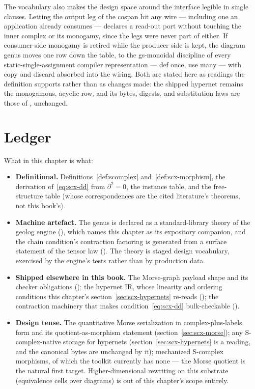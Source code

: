 The vocabulary also makes the design space around the interface
legible in single clauses. Letting the output leg of the cospan hit
any wire --- including one an application already consumes ---
declares a read-out port without touching the inner complex or its
monogamy, since the legs were never part of either. If consumer-side
monogamy is retired while the producer side is kept, the diagram
genus moves one row down the table, to the gs-monoidal discipline
of every static-single-assignment compiler representation --- def
once, use many --- with copy and discard absorbed into the wiring.
Both are stated here as readings the definition supports rather than
as changes made: the shipped hypernet remains the monogamous, acyclic
row, and its bytes, digests, and substitution laws are those of
, unchanged.

\section{Ledger}
\label{sec:scx-ledger}

What in this chapter is what:

\begin{itemize}
\item \textbf{Definitional.} Definitions~\ref{def:scomplex}
  and~\ref{def:scx-morphism}, the derivation of~\eqref{eq:scx-dd}
  from $\partial^2 = 0$, the instance table, and the free-structure
  table (whose correspondences are the cited literature's theorems,
  not this book's).
\item \textbf{Machine artefact.} The genus is declared as a
  standard-library theory of the geolog engine
  (), which names this chapter as its
  expository companion, and the chain condition's contraction
  factoring is generated from a surface statement of the tensor law
  (). The theory is staged
  design vocabulary, exercised by the engine's tests rather than by
  production data.
\item \textbf{Shipped elsewhere in this book.} The Morse-graph
  payload shape and its checker obligations
  (); the
  hypernet IR, whose linearity and ordering conditions this
  chapter's section~\ref{sec:scx-hypernets} re-reads
  (); the
  contraction machinery that makes
  condition~\eqref{eq:scx-dd} bulk-checkable
  ().
\item \textbf{Design tense.} The quantitative Morse serialization in
  complex-plus-labels form and its quotient-as-morphism statement
  (section~\ref{sec:scx-morse}); any S-complex-native storage for
  hypernets (section~\ref{sec:scx-hypernets} is a reading, and the
  canonical bytes are unchanged by it); mechanized S-complex
  morphisms, of which the toolkit currently has none --- the Morse
  quotient is the natural first target. Higher-dimensional
  rewriting on this substrate (equivalence cells over diagrams) is
  out of this chapter's scope entirely.
\end{itemize}
